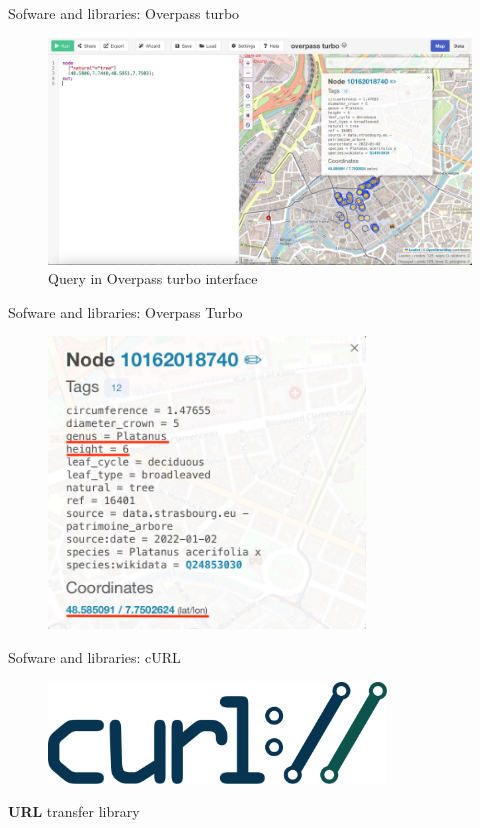 \documentclass[10pt]{beamer}
\begin{document}
\begin{frame}{Sofware and libraries: Overpass turbo}
    \begin{figure}[H]
      \centering
      \includegraphics[width=\textwidth]{images/overpass-turbo.png}
      \caption{Query in Overpass turbo interface}
    \end{figure}
\end{frame}

\begin{frame}{Sofware and libraries: Overpass Turbo}
  \begin{figure}[H]
    \centering
    \includegraphics[width=0.75\textwidth]{images/ovt-node.png}
  \end{figure}
\end{frame}

\begin{frame}{Sofware and libraries: cURL}
  \Large
  \begin{figure}[H]
      \centering
      \includegraphics[width=0.8\textwidth]{images/Curl-logo.svg.png}
  \end{figure}
  \begin{center}
    \Large \textbf{URL} transfer library
  \end{center}
\end{frame}
\end{document}
